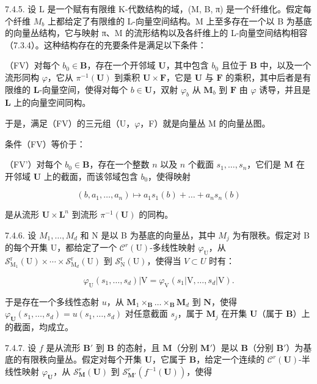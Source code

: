 7.4.5. 设 L 是一个赋有有限维 K-代数结构的域，(M, B, π) 是一个纤维化。假定每个纤维 \(M_{b}\) 上都给定了有限维的 L-向量空间结构。M 上至多存在一个以 B 为基底的向量丛结构，它与映射 π、M 的流形结构以及各纤维上的 L-向量空间结构相容（7.3.4）。这种结构存在的充要条件是满足以下条件：

（FV）对每个 \(b_0 \in \mathbf{B}\)，存在一个开邻域 \(\mathbf{U}\)，其中包含 \(b_0\) 且位于 \(\mathbf{B}\) 中，以及一个流形同构 \(\varphi\)，它从 \(\pi^{-1}(\mathbf{U})\) 到乘积 \(\mathbf{U} \times \mathbf{F}\)，它是 \(\mathbf{U}\) 与 \(\mathbf{F}\) 的乘积，其中后者是有限维的 \(\mathbf{L}\)-向量空间，使得对每个 \(b \in \mathbf{U}\)，双射 \(\varphi_b\) 从 \(\mathbf{M}_b\) 到 \(\mathbf{F}\) 由 \(\varphi\) 诱导，并且是 \(\mathbf{L}\) 上的向量空间同构。

于是，满足（FV）的三元组（U，\(\varphi\)，F）就是向量丛 M 的向量丛图。

条件（FV）等价于：

（FV'）对每个 \(b_0 \in \mathbf{B}\)，存在一个整数 \(n\) 以及 \(n\) 个截面 \(s_1, \ldots, s_n\)，它们是 \(\mathbf{M}\) 在开邻域 \(\mathbf{U}\) 上的截面，而该邻域包含 \(b_0\)，使得映射

\[
(b, a _ {1}, \dots , a _ {n}) \mapsto a _ {1} s _ {1} (b) + \dots + a _ {n} s _ {n} (b)
\]

是从流形 \(\mathbf{U} \times \mathbf{L}^{n}\) 到流形 \(\pi^{-1}(\mathbf{U})\) 的同构。

7.4.6. 设 \(M_{1},\ldots,M_{d}\) 和 N 是以 B 为基底的向量丛，其中 \(M_{j}\) 为有限秩。假定对 B 的每个开集 U，都给定了一个 \(\mathcal{C}^{r}(\mathrm{U})\)-多线性映射 \(\varphi_{\mathrm{U}}\)，从 \(\mathcal{S}_{\mathrm{M}_{1}}^{\mathrm{r}}(\mathrm{U})\times\cdots\times\mathcal{S}_{\mathrm{M}_{d}}^{\mathrm{r}}(\mathrm{U})\) 到 \(\mathcal{S}_{\mathrm{N}}^{\mathrm{r}}(\mathrm{U})\)，使得当 \(V \subset U\) 时有：

\[
\varphi_ {\mathrm{U}} (s _ {1}, \dots , s _ {d}) | \mathrm{V} = \varphi_ {\mathrm{V}} (s _ {1} | \mathrm{V}, \dots , s _ {d} | \mathrm{V}).
\]

于是存在一个多线性态射 \(u\)，从 \(\mathbf{M}_1 \times_{\mathbf{B}} \ldots \times_{\mathbf{B}} \mathbf{M}_d\) 到 \(\mathbf{N}\)，使得 \(\varphi_{\mathbf{U}}(s_1, \ldots, s_d) = u(s_1, \ldots, s_d)\) 对任意截面 \(s_j\)，属于 \(\mathbf{M}_j\) 在开集 \(\mathbf{U}\)（属于 \(\mathbf{B}\)）上的截面，均成立。

7.4.7. 设 \(f\) 是从流形 \(\mathbf{B}'\) 到 \(\mathbf{B}\) 的态射，且 \(\mathbf{M}\)（分别 \(\mathbf{M}'\)）是以 \(\mathbf{B}\)（分别 \(\mathbf{B}'\)）为基底的有限秩向量丛。假定对每个开集 \(\mathbf{U}\)，它属于 \(\mathbf{B}\)，给定一个连续的 \(\mathcal{C}^{r}(\mathbf{U})\)-半线性映射 \(\varphi_{\mathbf{U}}\)，从 \(\mathcal{S}_{\mathbf{M}}^{r}(\mathbf{U})\) 到 \(\mathcal{S}_{\mathbf{M}'}^{r}(f^{-1}(\mathbf{U}))\)，使得

